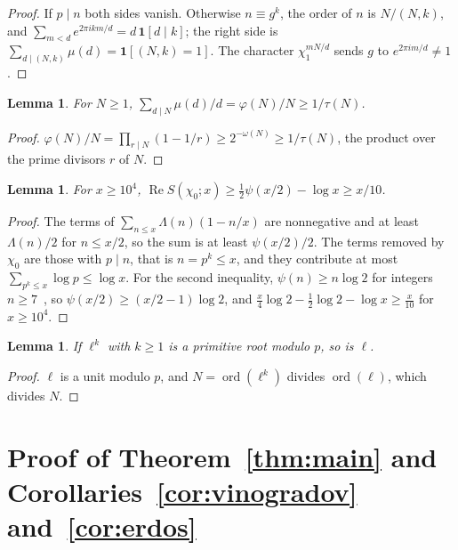 \documentclass[12pt]{amsart}
\newtheorem{lemma}[theorem]{Lemma}
\theoremstyle{remark}
\renewcommand{\Re}{\operatorname{Re}}
\newcommand{\ord}{\operatorname{ord}}
\begin{document}
\begin{proof}
If $p\mid n$ both sides vanish. Otherwise $n\equiv g^k$, the order of $n$ is $N/(N,k)$, and
$\sum_{m<d}e^{2\pi ikm/d}=d\,\mathbf 1[d\mid k]$; the right side is
$\sum_{d\mid(N,k)}\mu(d)=\mathbf 1[(N,k)=1]$. The character $\chi_1^{mN/d}$ sends $g$ to
$e^{2\pi im/d}\ne1$.
\end{proof}

\begin{lemma}\label{lem:arith}
For $N\ge1$, $\sum_{d\mid N}\mu(d)/d=\varphi(N)/N\ge1/\tau(N)$.
\end{lemma}

\begin{proof}
$\varphi(N)/N=\prod_{r\mid N}(1-1/r)\ge2^{-\omega(N)}\ge1/\tau(N)$, the product over the prime
divisors $r$ of $N$.
\end{proof}

\begin{lemma}\label{lem:principal}
For $x\ge10^4$, $\Re S(\chi_0;x)\ge\frac12\psi(x/2)-\log x\ge x/10$.
\end{lemma}

\begin{proof}
The terms of $\sum_{n\le x}\Lambda(n)(1-n/x)$ are nonnegative and at least $\Lambda(n)/2$ for
$n\le x/2$, so the sum is at least $\psi(x/2)/2$. The terms removed by $\chi_0$ are those with
$p\mid n$, that is $n=p^k\le x$, and they contribute at most $\sum_{p^k\le x}\log p\le\log x$.
For the second inequality, $\psi(n)\ge n\log2$ for integers $n\ge7$~\cite{Nai82}, so
$\psi(x/2)\ge(x/2-1)\log2$, and $\frac x4\log2-\frac12\log2-\log x\ge\frac x{10}$ for $x\ge10^4$.
\end{proof}

\begin{lemma}\label{lem:powers}
If $\ell^k$ with $k\ge1$ is a primitive root modulo $p$, so is $\ell$.
\end{lemma}

\begin{proof}
$\ell$ is a unit modulo $p$, and $N=\ord(\ell^k)$ divides $\ord(\ell)$, which divides $N$.
\end{proof}

\section{Proof of Theorem~\ref{thm:main} and Corollaries~\ref{cor:vinogradov} and~\ref{cor:erdos}}
\end{document}
